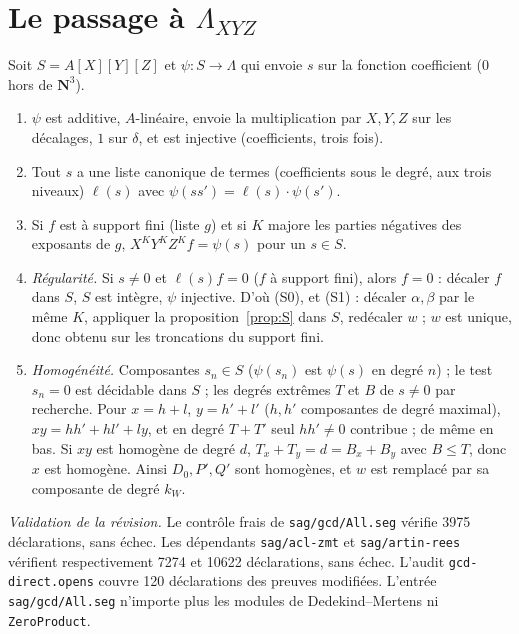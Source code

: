 \documentclass[11pt]{amsart}
\theoremstyle{definition}
\theoremstyle{remark}
\begin{document}
\section{Le passage à \texorpdfstring{$\Lambda_{XYZ}$}{Lambda XYZ}}

Soit $S=A[X][Y][Z]$ et $\psi:S\to\Lambda$ qui envoie $s$ sur la fonction
coefficient ($0$ hors de $\mathbf N^3$).
\begin{enumerate}
\item $\psi$ est additive, $A$-linéaire, envoie la multiplication par
  $X,Y,Z$ sur les décalages, $1$ sur $\delta$, et est injective
  (coefficients, trois fois).
\item Tout $s$ a une liste canonique de termes (coefficients sous le
  degré, aux trois niveaux) $\ell(s)$ avec
  $\psi(ss')=\ell(s)\cdot\psi(s')$.
\item Si $f$ est à support fini (liste $g$) et si $K$ majore les parties
  négatives des exposants de $g$, $X^KY^KZ^Kf=\psi(s)$ pour un $s\in S$.
\item \emph{Régularité.} Si $s\ne0$ et $\ell(s)f=0$ ($f$ à support fini),
  alors $f=0$ : décaler $f$ dans $S$, $S$ est intègre, $\psi$ injective.
  D'où (S0), et (S1) : décaler $\alpha,\beta$ par le même $K$, appliquer la
  proposition~\ref{prop:S} dans $S$, redécaler $w$ ; $w$ est unique, donc
  obtenu sur les troncations du support fini.
\item \emph{Homogénéité.} Composantes $s_n\in S$ ($\psi(s_n)$ est
  $\psi(s)$ en degré $n$) ; le test $s_n=0$ est décidable dans $S$ ; les
  degrés extrêmes $T$ et $B$ de $s\ne0$ par recherche. Pour $x=h+l$,
  $y=h'+l'$ ($h,h'$ composantes de degré maximal),
  $xy=hh'+hl'+ly$, et en degré $T+T'$ seul $hh'\ne0$ contribue ; de même en
  bas. Si $xy$ est homogène de degré $d$, $T_x+T_y=d=B_x+B_y$ avec $B\le T$,
  donc $x$ est homogène. Ainsi $D_0,P',Q'$ sont homogènes, et $w$ est
  remplacé par sa composante de degré $k_W$.
\end{enumerate}
\medskip
\noindent\emph{Validation de la révision.}
Le contrôle frais de \texttt{sag/gcd/All.seg} vérifie 3975 déclarations,
sans échec. Les dépendants \texttt{sag/acl-zmt} et
\texttt{sag/artin-rees} vérifient respectivement 7274 et 10622 déclarations,
sans échec. L'audit \texttt{gcd-direct.opens} couvre 120 déclarations
des preuves modifiées. L'entrée \texttt{sag/gcd/All.seg} n'importe
plus les modules de Dedekind--Mertens ni \texttt{ZeroProduct}.
\end{document}
